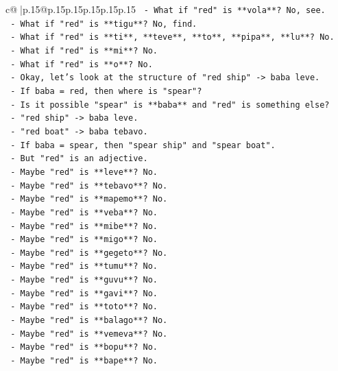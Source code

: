 \documentclass{article}
\begin{document}
{\begin{supertabular}{c@{$\;$}|p{.15\linewidth}@{}p{.15\linewidth}p{.15\linewidth}p{.15\linewidth}p{.15\linewidth}p{.15\linewidth}}
{{{\texttt{      {-} What if "red" is **vola**? No, see.} \\
\texttt{      {-} What if "red" is **tigu**? No, find.} \\
\texttt{      {-} What if "red" is **ti**, **teve**, **to**, **pipa**, **lu**? No.} \\
\texttt{      {-} What if "red" is **mi**? No.} \\
\texttt{      {-} What if "red" is **o**? No.} \\
\texttt{    {-} Okay, let's look at the structure of "red ship" {-}> baba leve.} \\
\texttt{    {-} If baba = red, then where is "spear"?} \\
\texttt{    {-} Is it possible "spear" is **baba** and "red" is something else?} \\
\texttt{      {-} "red ship" {-}> baba leve.} \\
\texttt{      {-} "red boat" {-}> baba tebavo.} \\
\texttt{      {-} If baba = spear, then "spear ship" and "spear boat".} \\
\texttt{      {-} But "red" is an adjective.} \\
\texttt{      {-} Maybe "red" is **leve**? No.} \\
\texttt{      {-} Maybe "red" is **tebavo**? No.} \\
\texttt{      {-} Maybe "red" is **mapemo**? No.} \\
\texttt{      {-} Maybe "red" is **veba**? No.} \\
\texttt{      {-} Maybe "red" is **mibe**? No.} \\
\texttt{      {-} Maybe "red" is **migo**? No.} \\
\texttt{      {-} Maybe "red" is **gegeto**? No.} \\
\texttt{      {-} Maybe "red" is **tumu**? No.} \\
\texttt{      {-} Maybe "red" is **guvu**? No.} \\
\texttt{      {-} Maybe "red" is **gavi**? No.} \\
\texttt{      {-} Maybe "red" is **toto**? No.} \\
\texttt{      {-} Maybe "red" is **balago**? No.} \\
\texttt{      {-} Maybe "red" is **vemeva**? No.} \\
\texttt{      {-} Maybe "red" is **bopu**? No.} \\
\texttt{      {-} Maybe "red" is **bape**? No.} \\
}}}
\end{supertabular}}
\end{document}

